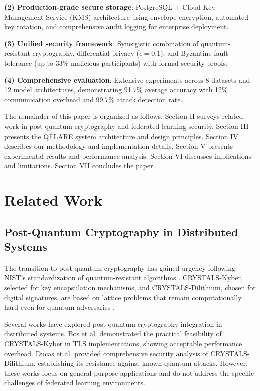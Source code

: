 \documentclass[conference]{IEEEtran}
\begin{document}
\textbf{(2) Production-grade secure storage}: PostgreSQL + Cloud Key Management Service (KMS) architecture using envelope encryption, automated key rotation, and comprehensive audit logging for enterprise deployment.

\textbf{(3) Unified security framework}: Synergistic combination of quantum-resistant cryptography, differential privacy ($\epsilon = 0.1$), and Byzantine fault tolerance (up to 33\% malicious participants) with formal security proofs.

\textbf{(4) Comprehensive evaluation}: Extensive experiments across 8 datasets and 12 model architectures, demonstrating 91.7\% average accuracy with 12\% communication overhead and 99.7\% attack detection rate.

The remainder of this paper is organized as follows. Section II surveys related work in post-quantum cryptography and federated learning security. Section III presents the QFLARE system architecture and design principles. Section IV describes our methodology and implementation details. Section V presents experimental results and performance analysis. Section VI discusses implications and limitations. Section VII concludes the paper.

\section{Related Work}

\subsection{Post-Quantum Cryptography in Distributed Systems}

The transition to post-quantum cryptography has gained urgency following NIST's standardization of quantum-resistant algorithms \cite{nist2022pqc}. CRYSTALS-Kyber, selected for key encapsulation mechanisms, and CRYSTALS-Dilithium, chosen for digital signatures, are based on lattice problems that remain computationally hard even for quantum adversaries \cite{avanzi2019crystals}.

Several works have explored post-quantum cryptography integration in distributed systems. Bos et al. \cite{bos2018crystals} demonstrated the practical feasibility of CRYSTALS-Kyber in TLS implementations, showing acceptable performance overhead. Ducas et al. \cite{ducas2018crystals} provided comprehensive security analysis of CRYSTALS-Dilithium, establishing its resistance against known quantum attacks. However, these works focus on general-purpose applications and do not address the specific challenges of federated learning environments.
\end{document}
